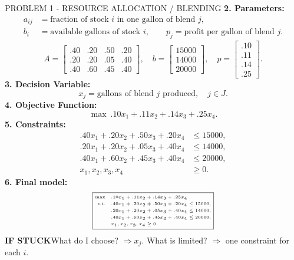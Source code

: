\documentclass[10pt,landscape]{article}
\newcommand{\stuck}{\textbf{IF STUCK}\quad}
\begin{document}
\begin{minipage}[t]{0.327\textwidth}
\begin{blk}{PROBLEM 1 - RESOURCE ALLOCATION / BLENDING}
\textbf{2. Parameters:}
\[
\begin{aligned}
a_{ij}&=\text{fraction of stock }i\text{ in one gallon of blend }j,\\
b_i&=\text{available gallons of stock }i,\qquad p_j=\text{profit per gallon of blend }j.
\end{aligned}
\]
\[
A=\begin{bmatrix}.40&.20&.50&.20\\.20&.20&.05&.40\\.40&.60&.45&.40\end{bmatrix},\quad
b=\begin{bmatrix}15000\\14000\\20000\end{bmatrix},\quad p=\begin{bmatrix}.10\\.11\\.14\\.25\end{bmatrix}.
\]
\textbf{3. Decision Variable:}
\[
\boxed{x_j=\text{gallons of blend }j\text{ produced},\quad j\in J}.
\]
\textbf{4. Objective Function:}
\[
\boxed{\max\ .10x_1+.11x_2+.14x_3+.25x_4}.
\]
\textbf{5. Constraints:}
\[
\begin{aligned}
.40x_1+.20x_2+.50x_3+.20x_4&\le15000,\\
.20x_1+.20x_2+.05x_3+.40x_4&\le14000,\\
.40x_1+.60x_2+.45x_3+.40x_4&\le20000,\\
x_1,x_2,x_3,x_4&\ge0.
\end{aligned}
\]
\textbf{6. Final model:}
\[
{\fontsize{5.0}{5.15}\selectfont
\boxed{\begin{aligned}
\max\quad&.10x_1+.11x_2+.14x_3+.25x_4\\
\text{s.t.}\quad&.40x_1+.20x_2+.50x_3+.20x_4\le15000,\\
&.20x_1+.20x_2+.05x_3+.40x_4\le14000,\\
&.40x_1+.60x_2+.45x_3+.40x_4\le20000,\\
&x_1,x_2,x_3,x_4\ge0.
\end{aligned}}}
\]
\stuck What do I choose? $\Rightarrow x_j$. What is limited? $\Rightarrow$ one constraint for each $i$.
\end{blk}
\end{minipage}\hfill
%
\end{document}
